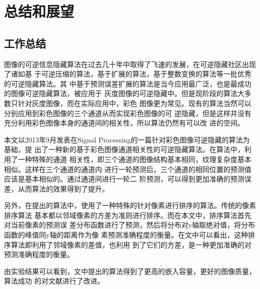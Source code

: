 ﻿\chapter{总结和展望}
\label{c:conclusion}

\section{工作总结}
图像的可逆信息隐藏算法在过去几十年中取得了飞速的发展，在可逆隐藏社区出现了诸如基
于可逆压缩的算法，基于扩展的算法，基于整数变换的算法等一批优秀的可逆隐藏算法。其
中基于预测误差扩展的算法是当今应用最广泛，也是最成功的图像可逆隐藏算法，被应用于
灰度图像的可逆隐藏中。但是现阶段的算法大多数只针对灰度图像，而在实际应用中，彩色
图像更为常见。现有的算法当然可以分别应用到彩色图像的三个通道从而实现彩色图像的可
逆隐藏，但是这样并没有充分利用彩色图像本身的通道间的相关性，所以算法仍然有可以改
进的空间。
\par
本文以2013年9月发表在Signal Processing的一篇针对彩色图像可逆隐藏的算法为基础，提
出了一种新的基于彩色图像通道相关性的可逆隐藏算法。在算法中，利用了一种特殊的通道
相关性，即三个通道的图像结构基本相同，纹理复杂度基本相似。这样在三个通道的通道内
进行一轮预测后，三个通道的相同位置的预测值应该是基本相似的。通过通道间进行一轮二
阶预测，可以得到更加准确的预测误差，从而算法的效果得到了提升。
\par
另外，在提出的算法中，使用了一种特殊的针对像素进行排序的算法。传统的像素排序算法
基本都以邻域像素的方差为准则进行排序。而在本文中，排序算法首先对当前像素的预测误
差分布函数进行了预测，然后将分布对y轴取绝对值，将分布函数的峰值同y轴的距离作为像
素预测准确程度的衡量。在文中可以看出，这种排序算法即利用了邻域像素的差值，也利用
到了它们的方差，是一种更加准确的对预测准确程度的衡量。
\par
由实验结果可以看到，文中提出的算法得到了更高的嵌入容量，更好的图像质量，算法成功
的对文献\cite{li2013reversible}进行了改进。

